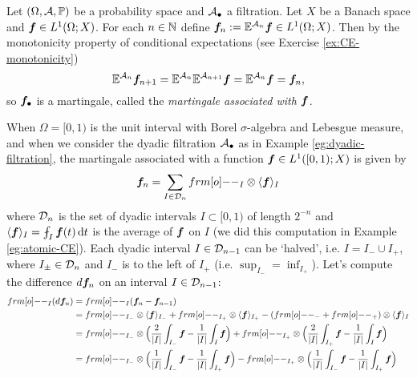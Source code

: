 \begin{example}
  Let $(\Omega, \mathcal{A}, \mathbb{P})$ be a probability space and $\mathcal{A}_{\bullet}$ a filtration.
  Let $X$ be a Banach space and $\bm{f} \in L^1(\Omega;X)$.
  For each $n \in \mathbb{N}$ define $\bm{f}_n := \mathbb{E}^{\mathcal{A}_n}\bm{f} \in L^1(\Omega;X)$.
  Then by the monotonicity property of conditional expectations (see Exercise \ref{ex:CE-monotonicity})
  \begin{equation*}
    \mathbb{E}^{\mathcal{A}_n} \bm{f}_{n+1} = \mathbb{E}^{\mathcal{A}_n} \mathbb{E}^{\mathcal{A}_{n+1}} \bm{f} = \mathbb{E}^{\mathcal{A}_n} \bm{f} = \bm{f}_n,
  \end{equation*}
  so $\bm{f}_{\bullet}$ is a martingale, called the \emph{martingale associated with $\bm{f}$}. 

  When $\Omega = [0,1)$ is the unit interval with Borel $\sigma$-algebra and Lebesgue measure, and when we consider the dyadic filtration $\mathcal{A}_{\bullet}$ as in Example \ref{eg:dyadic-filtration}, the martingale associated with a function $\bm{f} \in L^1([0,1);X)$ is given by
  \begin{equation*}
    \mb{f}_n = \sum_{I \in \mc{D}_n} \1_I \otimes \langle \mb{f} \rangle_I
  \end{equation*}
  where $\mathcal{D}_n$ is the set of dyadic intervals $I \subset [0,1)$ of length $2^{-n}$ and $\langle \mb{f} \rangle_I = \fint_I \mb{f}(t) \, \dd t$ is the average of $\bm{f}$ on $I$ (we did this computation in Example \ref{eg:atomic-CE}).
  Each dyadic interval $I \in \mathcal{D}_{n-1}$ can be `halved', i.e. $I = I_{-} \cup I_{+}$, where $I_{\pm} \in \mathcal{D}_{n}$ and $I_-$ is to the left of $I_+$ (i.e. $\sup_{I_-} = \inf_{I_+}$).
  Let's compute the difference $d\bm{f}_n$ on an interval $I \in \mathcal{D}_{n-1}$:
  \begin{equation*}
    \begin{aligned}
      \1_{I}(d\mb{f}_{n}) &= \1_{I}(\mb{f}_{n} - \mb{f}_{n-1}) \\
      &= \1_{I_{-}} \otimes \langle \mb{f} \rangle_{I_{-}} + \1_{I_{+}} \otimes \langle \mb{f} \rangle_{I_{+}} - (\1_{-} + \1_{+}) \otimes \langle \mb{f} \rangle_{I} \\
      &= \1_{I_{-}} \otimes \Big( \frac{2}{|I|}\int_{I_{-}} \mb{f} - \frac{1}{|I|}\int_{I} \mb{f} \Big) + \1_{I_{+}} \otimes \Big( \frac{2}{|I|}\int_{I_{+}} \mb{f} - \frac{1}{|I|}\int_{I} \mb{f} \Big) \\
      &= \1_{I_{-}} \otimes \Big( \frac{1}{|I|}\int_{I_{-}} \mb{f} - \frac{1}{|I|}\int_{I_{+}} \mb{f} \Big) - \1_{I_{+}} \otimes \Big( \frac{1}{|I|}\int_{I_{-}} \mb{f} - \frac{1}{|I|}\int_{I_{+}} \mb{f} \Big) \\

\end{aligned}
\end{equation*}
\end{example}

